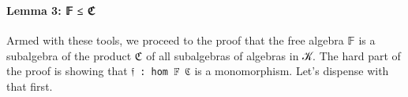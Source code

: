 \begin{code}
%
\>[1]\AgdaSpace{}%
\AgdaSpace{}%
\AgdaSpace{}%
\AgdaSymbol{=}\AgdaSpace{}%
\<%
\\
%
\\[\AgdaEmptyExtraSkip]%
%
\>[1]\<%
\\
%
\>[1]\AgdaSpace{}%
\AgdaSymbol{:}\AgdaSpace{}%
\AgdaSpace{}%
\AgdaSymbol{(}\AgdaSpace{}%
\AgdaSymbol{(}\AgdaSymbol{)}\AgdaSpace{}%
\AgdaSymbol{)}\AgdaSpace{}%
\AgdaSymbol{(}\AgdaSpace{}%
\AgdaSymbol{(}\AgdaSymbol{))}\<%
\\
%
\>[1]\AgdaSpace{}%
\AgdaSymbol{=}\AgdaSpace{}%
\AgdaSymbol{\{}\AgdaSymbol{\}\{}\AgdaSymbol{\}(}\AgdaSymbol{\{}\AgdaSymbol{\}\{}\AgdaSymbol{\}}\AgdaSpace{}%
\AgdaSymbol{)}\<%
\end{code}

\paragraph{Lemma 3: 𝔽 ≤ ℭ}\label{lemma-3-ux1d53d-ux212d}

Armed with these tools, we proceed to the proof that the free algebra 𝔽
is a subalgebra of the product ℭ of all subalgebras of algebras in 𝒦.
The hard part of the proof is showing that \texttt{𝔣\ :\ hom\ 𝔽\ ℭ} is a
monomorphism. Let's dispense with that first.

